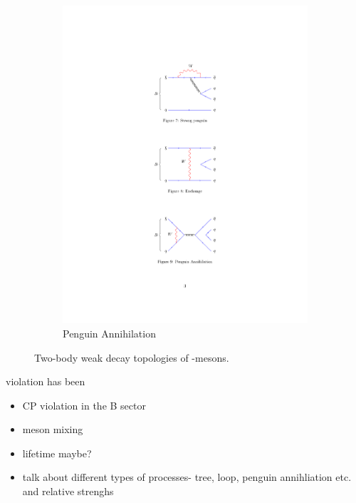 \begin{figure}[!h]
\begin{subfigure}[b]{0.32\textwidth}
        \includegraphics[width=1.0\textwidth]{figs/Theory/PengAn.pdf}
        \caption{Penguin Annihilation}
    \end{subfigure}
    \caption{Two-body weak decay topologies of \bquark-mesons.}
    \label{fig:Theory_topo}   
\end{figure}




\CP violation has been 



{\color{Red}
\begin{itemize}
\item CP violation in the B sector
\item \B meson mixing
\item lifetime maybe?
\item talk about different types of processes- tree, loop, penguin annihliation etc. and relative strenghs 
\end{itemize}}

